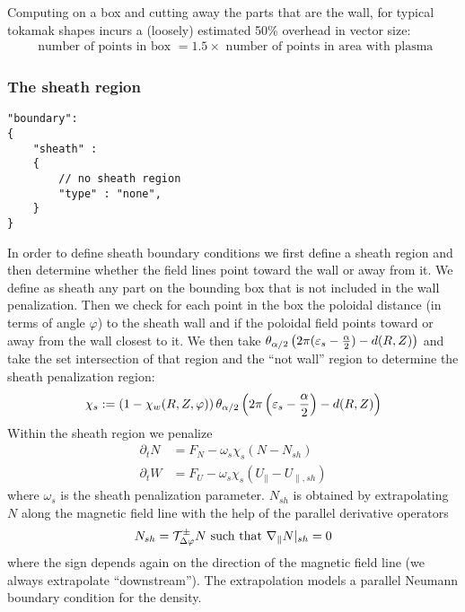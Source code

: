 \begin{tcolorbox}[title=Note]
    Computing on a box and cutting away the parts that are the wall,
    for typical tokamak shapes incurs a (loosely) estimated 50\% overhead in vector size:
    \begin{align*}
        \text{ number of points in box } = 1.5 \times \text{ number of points in area with plasma}
    \end{align*}
\end{tcolorbox}

\subsubsection{The sheath region}\label{sec:sheath}
\begin{verbatim}
"boundary":
{
    "sheath" :
    {
        // no sheath region
        "type" : "none",
    }
}
\end{verbatim}
In order to define sheath boundary conditions we first define a sheath region
and then determine whether the field lines point toward the wall or away from it.
We define as sheath any part on the bounding box that is not included in the wall
penalization. Then we check for each point in the box the poloidal distance (in
terms of angle $\varphi$) to the sheath wall and if the poloidal field points
toward or away from the wall closest to it.
We then take $\theta_{\alpha/2}\left( 2\pi(\varepsilon_s - \frac{\alpha}{2}) - d(R,Z)\right)$
and take the set intersection of that region and the ``not wall'' region to
determine the sheath penalization region:
\begin{align}\label{eq:sheath}
\chi_s := \left(1-\chi_w(R,Z,\varphi)\right) \theta_{\alpha/2}\left( 2\pi\left(\varepsilon_s - \frac{\alpha}{2}\right) - d(R,Z)\right)
\end{align}
Within the sheath region we penalize
\begin{subequations} \label{eq:sheath_penalization}
\begin{align}
    \partial_t N &= F_N -\omega_s \chi_s \left(N-N_{sh}\right)\\
    \partial_t W &= F_U -\omega_s \chi_s \left(U_\parallel-U_{\parallel,sh}\right)
\end{align}
\end{subequations}
where $\omega_s$ is the sheath penalization parameter.
$N_{sh}$ is obtained by extrapolating $N$ along the magnetic field line with
the help of the parallel derivative operators
\begin{align}
    N_{sh} = \mathcal T^\pm_{\Delta\varphi} N \text{ such that } \nabla_\parallel N|_{sh} = 0
\end{align}
where the sign depends again on the direction of the magnetic field line (we always extrapolate ``downstream'').
The extrapolation models a parallel Neumann boundary condition for the density.

